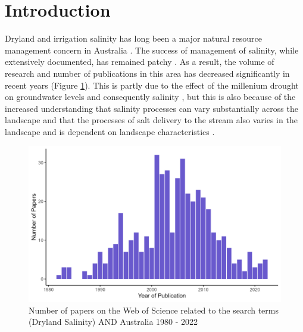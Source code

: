\documentclass[, manuscript]{copernicus}
\begin{document}
\section{Introduction}

Dryland and irrigation salinity has long been a major natural resource
management concern in Australia
\citep{Jolly2001, White2009, Scanlon2007, Walker2002, Finlayson2010}.
The success of management of salinity, while extensively documented, has
remained patchy \citep{Leblanc2012}. As a result, the volume of research
and number of publications in this area has decreased significantly in
recent years (Figure \ref{fig:SalinityPapers}). This is partly due to
the effect of the millenium drought on groundwater levels and
consequently salinity \citep{Mcfarlane2016}, but this is also because of
the increased understanding that salinity processes can vary
substantially across the landscape \citep{Conyers2008} and that the
processes of salt delivery to the stream also varies in the landscape
\citep{Summerell2006, Hughes2007} and is dependent on landscape
characteristics \citep{vanDijk2008, Dalhaus2010}.

\begin{figure}
\includegraphics[width=0.9\linewidth]{Figures/Dryland Salinity Papers} \caption{Number of papers on the Web of Science related to the search terms (Dryland Salinity) AND Australia 1980 - 2022}\label{fig:SalinityPapers}
\end{figure}
\end{document}
